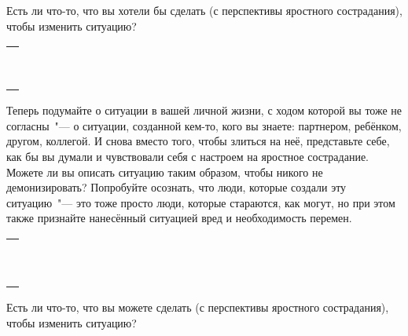 \begin{itemize}
	\itemWritingHand Есть ли что-то, что вы хотели бы сделать (с перспективы яростного сострадания), чтобы изменить ситуацию?
\end{itemize}
\setlength{\extrarowheight}{2mm}
\begin{tabularx}{\textwidth}{X}
	\\
	\arrayrulecolor{gray}\hline\\
	\hline\\
	\hline\\
	\hline\\
	\hline\\
	\hline\\	
	\hline\\
	\hline\\
	\hline\\
	\hline\\
\end{tabularx}
\setlength{\extrarowheight}{0mm}
\begin{itemize}
	\itemWritingHand Теперь подумайте о ситуации в вашей личной жизни, с ходом которой вы тоже не согласны~"--- о ситуации, созданной кем-то, кого вы знаете: партнером, ребёнком, другом, коллегой. И снова вместо того, чтобы злиться на неё, представьте себе, как бы вы думали и чувствовали себя с настроем на яростное сострадание. Можете ли вы описать ситуацию таким образом, чтобы никого не демонизировать? Попробуйте осознать, что люди, которые создали эту ситуацию~"--- это тоже просто люди, которые стараются, как могут, но при этом также признайте нанесённый ситуацией вред и необходимость перемен.
\end{itemize}
\setlength{\extrarowheight}{2mm}
\begin{tabularx}{\textwidth}{X}
	\\
	\arrayrulecolor{gray}\hline\\
	\hline\\
	\hline\\
	\hline\\
	\hline\\
	\hline\\	
	\hline\\
	\hline\\
	\hline\\
	\hline\\
	\hline\\
\end{tabularx}
\setlength{\extrarowheight}{0mm}
\begin{itemize}
	\itemWritingHand Есть ли что-то, что вы можете сделать (с перспективы яростного сострадания), чтобы изменить ситуацию?
\end{itemize}
